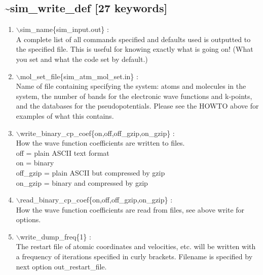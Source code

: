 \documentclass[12pt,titlepage]{article}
\begin{document}
\subsection*{\bf \~{}sim\_write\_def [27 keywords]}
\begin{enumerate}

 \vspace{0.15in} 
 \item   $\backslash$sim\_name\{sim\_input.out\} : \\
    A complete list of all commands specified and defaults used is outputted to the specified file.  This is useful for knowing exactly what is going on!  (What you set and what the code set by default.)

\vspace{0.15in} 
 \item   $\backslash$mol\_set\_file\{sim\_atm\_mol\_set.in\} : \\
    Name of file containing specifying the system: atoms and molecules in the system, the number of bands for the electronic wave functions and k-points, and the databases for the pseudopotentials.  Please see the HOWTO above for examples of what this contains.

\vspace{0.15in} 
 \item   $\backslash$write\_binary\_cp\_coef\{on,off,off\_gzip,on\_gzip\} : \\
 How the wave function coefficients are written to files.\\
 off = plain ASCII text format\\
 on = binary\\
 off\_gzip = plain ASCII but compressed by gzip\\
 on\_gzip = binary and compressed by gzip
 
\vspace{0.15in} 
 \item   $\backslash$read\_binary\_cp\_coef\{on,off,off\_gzip,on\_gzip\} : \\
 How the wave function coefficients are read from files, see above write for options.



 \vspace{0.15in} 
 \item   $\backslash$write\_dump\_freq\{1\} : \\
     The restart file of atomic coordinates and velocities, etc. will be
     written with a frequency of iterations specified in curly brackets.  Filename is specified by
     next option out\_restart\_file.


\end{enumerate}
\end{document}
